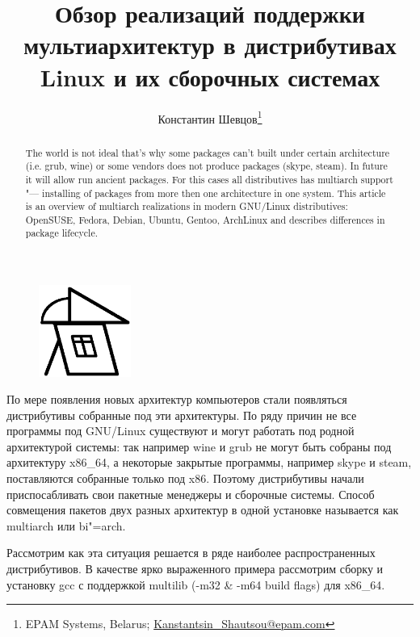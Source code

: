 \documentclass[10pt, a5paper]{article}
\begin{document}
\title{Обзор реализаций поддержки мультиархитектур в дистрибутивах Linux и их сборочных системах}%

\author{Константин Шевцов\footnote{EPAM Systems, Belarus; \url{Kanstantsin_Shautsou@epam.com}}}
\maketitle

\begin{abstract}
The world is not ideal that's why some packages can't built under certain architecture (i.e. grub, wine) or some vendors does not produce packages (skype, steam). In future it will allow run ancient packages.
For this cases all distributives has multiarch support "--- installing of packages from more then one architecture in one system.
This article is an overview of multiarch realizations in modern GNU/Linux distributives: OpenSUSE, Fedora, Debian, Ubuntu, Gentoo, ArchLinux and describes differences in package lifecycle.
\end{abstract}

\begin{figure}[h!]
  \centering
  \includegraphics[height=3cm]{17_multiarch_logo}
\end{figure}

По мере появления новых архитектур компьютеров стали появляться дистрибутивы собранные под эти архитектуры. По ряду причин не все программы под GNU/Linux существуют и могут работать под родной архитектурой системы: так например wine и grub не могут быть собраны под архитектуру x86\_64, а некоторые закрытые программы, например skype и steam, поставляются собранные только под x86. Поэтому дистрибутивы начали приспосабливать свои пакетные менеджеры и сборочные системы. Способ совмещения пакетов двух разных архитектур в одной установке называется как multiarch или bi"=arch.

Рассмотрим как эта ситуация решается в ряде наиболее распространенных дистрибутивов. В качестве ярко выраженного примера рассмотрим сборку и установку gcc с поддержкой multilib (-m32 \& -m64 build flags) для x86\_64.
\end{document}
